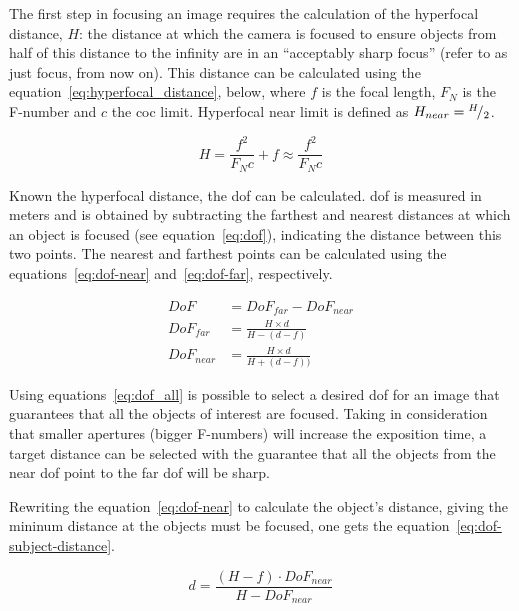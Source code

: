 The first step in focusing an image requires the calculation of the hyperfocal distance, $H$: the distance at which the camera is focused to ensure objects from half of this distance to the infinity are in an ``acceptably sharp focus'' (refer to as just focus, from now on). This distance can be calculated using the equation~\ref{eq:hyperfocal_distance}, below, where $f$ is the focal length, $F_N$ is the F-number and $c$ the \ac{coc} limit. Hyperfocal near limit is defined as $H_{near} = {}^{H}\!/_{2}$.

\begin{equation}
	\label{eq:hyperfocal_distance}
	H = \frac{f^2}{F_Nc} + f \approx \frac{f^2}{F_Nc} 
\end{equation}

Known the hyperfocal distance, the \acf{dof} can be calculated. \ac{dof} is measured in meters and is obtained by subtracting the farthest and nearest distances at which an object is focused (see equation~\ref{eq:dof}), indicating the distance between this two points\cite{Photopillers, Merklinger1993, mvg_book}. The nearest and farthest points can be calculated using the equations~\ref{eq:dof-near} and~\ref{eq:dof-far}, respectively.

\begin{subequations}
	\label{eq:dof_all}
	\begin{align}
		DoF & = DoF_{far} - DoF_{near} \label{eq:dof} \\
		DoF_{far} & = \frac{H\times d}{H - (d - f)} \label{eq:dof-far} \\
		DoF_{near} & = \frac{H\times d}{H + (d - f))} \label{eq:dof-near} 
	\end{align}
\end{subequations}

Using equations~\ref{eq:dof_all} is possible to select a desired \acl{dof} for an image that guarantees that all the objects of interest are focused. Taking in consideration that smaller apertures (bigger F-numbers) will increase the exposition time\cite{Merklinger1993}, a target distance can be selected with the guarantee that all the objects from the near \ac{dof} point to the far \ac{dof} will be sharp.

Rewriting the equation~\ref{eq:dof-near} to calculate the object's distance, giving the mininum distance at the objects must be focused, one gets the equation~\ref{eq:dof-subject-distance}.

\begin{equation}
	\label{eq:dof-subject-distance}
	d = \frac{(H - f) \cdot DoF_{near}}{H - DoF_{near}}
\end{equation}


